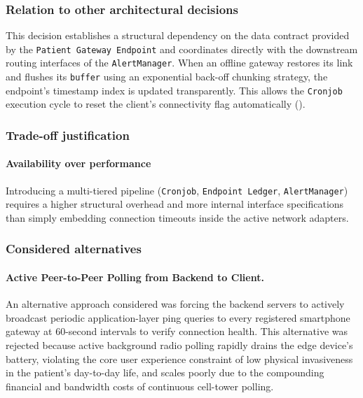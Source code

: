 \subsubsection*{Relation to other architectural decisions}
This decision establishes a structural dependency on the data contract provided by the \texttt{Patient Gateway Endpoint} and coordinates directly with the downstream routing interfaces of the \texttt{AlertManager}. When an offline gateway restores its link and flushes its \texttt{buffer} using an exponential back-off chunking strategy, the endpoint's timestamp index is updated transparently. This allows the \texttt{Cronjob} execution cycle to reset the client's connectivity flag automatically ().

\subsubsection*{Trade-off justification}
\paragraph{Availability over performance}
Introducing a multi-tiered pipeline (\texttt{Cronjob}, \texttt{Endpoint Ledger}, \texttt{AlertManager}) requires a higher structural overhead and more internal interface specifications than simply embedding connection timeouts inside the active network adapters.

\subsubsection*{Considered alternatives}
\paragraph{Active Peer-to-Peer Polling from Backend to Client.}
An alternative approach considered was forcing the backend servers to actively broadcast periodic application-layer ping queries to every registered smartphone gateway at 60-second intervals to verify connection health. This alternative was rejected because active background radio polling rapidly drains the edge device's battery, violating the core user experience constraint of low physical invasiveness in the patient's day-to-day life, and scales poorly due to the compounding financial and bandwidth costs of continuous cell-tower polling.
